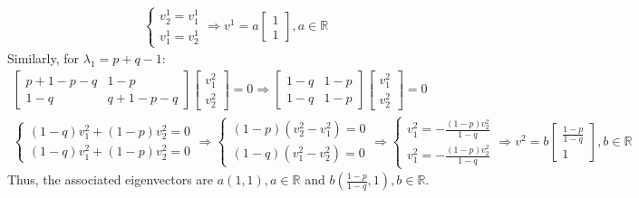 \documentclass[]{article}
\begin{document}
\begin{enumerate}[label=\alph*)]
\begin{equation}
\begin{split}
\begin{cases}
	 	v_2^1 = v_1^1 \\ v_1^1 = v_2^1
	 	\end{cases} \Rightarrow v^1 = a\begin{bmatrix}
	 	1 \\ 1
	 	\end{bmatrix}, a\in\mathbb{R}
	 	\end{split}
	 \end{equation}
	 Similarly, for $\lambda_1=p+q-1$:
	 \begin{equation}
	 \begin{split}
	 	\begin{bmatrix}
	 		p+1-p-q & 1-p \\ 1-q & q+1-p-q
	 	\end{bmatrix}\begin{bmatrix}
	 		v_1^2 \\ v_2^2
	 	\end{bmatrix} = 0 \Rightarrow \begin{bmatrix}
	 	1-q & 1-p \\ 1-q & 1-p
	 	\end{bmatrix}\begin{bmatrix}
	 	v_1^2 \\ v_2^2	 	\end{bmatrix} = 0\\ \nonumber	
	 	\begin{cases}
	 		(1-q)v_1^2 + (1-p)v_2^2 = 0 \\ (1-q)v_1^2+(1-p)v_2^2 = 0
	 	\end{cases} \Rightarrow
	 	\begin{cases}
	 		(1-p)(v_2^2-v_1^2)=0 \\ (1-q)(v_1^2 - v_2^2) = 0
	 	\end{cases} \Rightarrow \begin{cases}
	 		v_1^2 = -\frac{(1-p)v_2^2}{1-q} \\ v_1^2 = -\frac{(1-p)v_2^2}{1-q}
	 	\end{cases} \Rightarrow v^2 = b\begin{bmatrix}
	 		\frac{1-p}{1-q} \\ 1
	 	\end{bmatrix}, b\in\mathbb{R}
	 \end{split}
	 \end{equation}
	 Thus, the associated eigenvectors are $a(1, 1), a\in\mathbb{R}$ and $b(\frac{1-p}{1-q}, 1), b\in\mathbb{R}$.
\end{enumerate}
\end{document}
